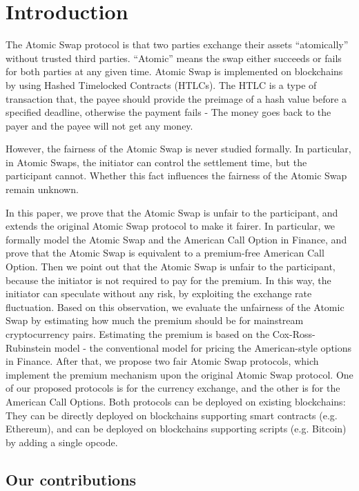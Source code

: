 \section{Introduction}
\label{sec:intro}

The Atomic Swap protocol is that two parties exchange their assets ``atomically'' without trusted third parties.
``Atomic'' means the swap either succeeds or fails for both parties at any given time. 
Atomic Swap is implemented on blockchains by using Hashed Timelocked Contracts (HTLCs).
The HTLC is a type of transaction that, the payee should provide the preimage of a hash value before a specified deadline, otherwise the payment fails - The money goes back to the payer and the payee will not get any money.

However, the fairness of the Atomic Swap is never studied formally.
In particular, in Atomic Swaps, the initiator can control the settlement time, but the participant cannot.
Whether this fact influences the fairness of the Atomic Swap remain unknown.

In this paper, we prove that the Atomic Swap is unfair to the participant, and extends the original Atomic Swap protocol to make it fairer.
In particular, we formally model the Atomic Swap and the American Call Option in Finance,
and prove that the Atomic Swap is equivalent to a premium-free American Call Option.
Then we point out that the Atomic Swap is unfair to the participant, because the initiator is not required to pay for the premium.
In this way, the initiator can speculate without any risk, by exploiting the exchange rate fluctuation.
Based on this observation, we evaluate the unfairness of the Atomic Swap by estimating how much the premium should be for mainstream cryptocurrency pairs.
Estimating the premium is based on the Cox-Ross-Rubinstein model - the conventional model for pricing the American-style options in Finance.
After that, we propose two fair Atomic Swap protocols, which implement the premium mechanism upon the original Atomic Swap protocol.
One of our proposed protocols is for the currency exchange, and the other is for the American Call Options.
Both protocols can be deployed on existing blockchains:
They can be directly deployed on blockchains supporting smart contracts (e.g. Ethereum),
and can be deployed on blockchains supporting scripts (e.g. Bitcoin) by adding a single opcode.

\subsection{Our contributions}

